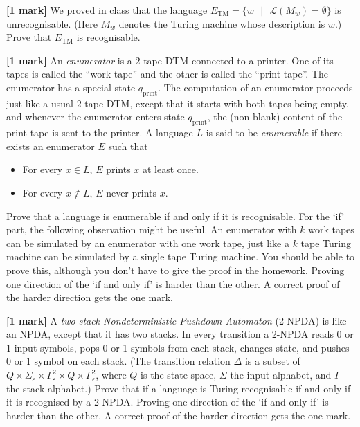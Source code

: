\documentclass[10pt,addpoints]{exam}
\begin{document}
\vspace{0.5cm}

\begin{questions}

\newpage
\question\textbf{[1 mark]} We proved in class that the language $E_{\text{TM}}=\{w\text{ }|\text{ }\mathcal{L}(M_w)=\emptyset\}$ is unrecognisable. (Here $M_w$ denotes the Turing machine whose description is $w$.) Prove that $\overline{E_{\text{TM}}}$ is recognisable.



\newpage

\question\textbf{[1 mark]} An \textit{enumerator} is a $2$-tape DTM connected to a printer. One of its tapes is called the ``work tape'' and the other is called the ``print tape''. The enumerator has a special state $q_{\text{print}}$. The computation of an enumerator proceeds just like a usual $2$-tape DTM, except that it starts with both tapes being empty, and whenever the enumerator enters state $q_{\text{print}}$, the (non-blank) content of the print tape is sent to the printer. A language $L$ is said to be \textit{enumerable} if there exists an enumerator $E$ such that
\begin{itemize}
\item For every $x\in L$, $E$ prints $x$ at least once.
\item For every $x\notin L$, $E$ never prints $x$.
\end{itemize}
Prove that a language is enumerable if and only if it is recognisable. For the `if' part, the following observation might be useful. An enumerator with $k$ work tapes can be simulated by an enumerator with one work tape, just like a $k$ tape Turing machine can be simulated by a single tape Turing machine. You should be able to prove this, although you don't have to give the proof in the homework. Proving one direction of the `if and only if' is harder than the other. A correct proof of the harder direction gets the one mark.



\newpage
\question\textbf{[1 mark]} A \textit{two-stack Nondeterministic Pushdown Automaton} (2-NPDA) is like an NPDA, except that it has two stacks. In every transition a 2-NPDA reads 0 or 1 input symbols, pops 0 or 1 symbols from each stack, changes state, and pushes 0 or 1 symbol on each stack. (The transition relation $\Delta$ is a subset of $Q\times\Sigma_{\varepsilon}\times\Gamma_{\varepsilon}^2\times Q\times\Gamma_{\varepsilon}^2$, where $Q$ is the state space, $\Sigma$ the input alphabet, and $\Gamma$ the stack alphabet.) Prove that if a language is Turing-recognisable if and only if it is recognised by a 2-NPDA. Proving one direction of the `if and only if' is harder than the other. A correct proof of the harder direction gets the one mark.


\end{questions}
\end{document}
